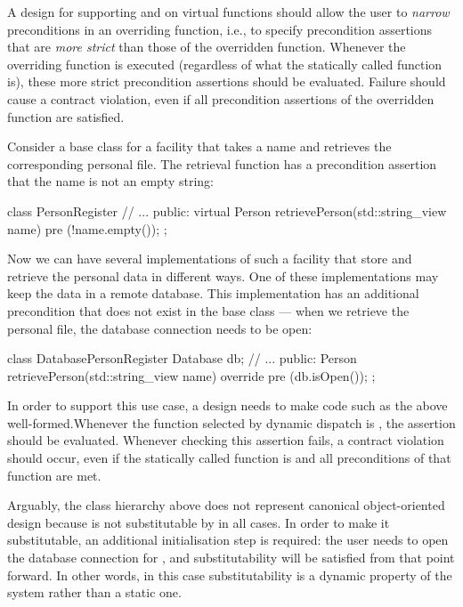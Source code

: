 
A design for supporting  and  on virtual functions should allow the user to \emph{narrow} preconditions in an overriding function, i.e., to specify precondition assertions 
 that are \emph{more strict} than those of the overridden function. Whenever the overriding function is executed (regardless of what the statically called function is), these more strict precondition assertions should be evaluated. Failure should cause a contract violation, even if all precondition assertions of the overridden function are satisfied.

Consider a base class for a facility that takes a name and retrieves the corresponding personal file. The retrieval function has a precondition assertion that the name is not an empty string:
\begin{codeblock} %
class PersonRegister {
  // ...
public:
  virtual Person retrievePerson(std::string_view name)
    pre (!name.empty());
};
\end{codeblock}
Now we can have several implementations of such a facility that store and retrieve the personal data in different ways. One of these implementations may keep the data in a remote database. This implementation has an additional precondition that does not exist in the base class --- when we retrieve the personal file, the database connection needs to be open:
\begin{codeblock}
class DatabasePersonRegister {
  Database db;
  // ...
public:
  Person retrievePerson(std::string_view name) override
    pre (db.isOpen());
};
\end{codeblock}
In order to support this use case, a design needs to make code such as the above well-formed.Whenever the function selected by dynamic dispatch is \allowbreak{}, the assertion  should be evaluated. Whenever checking this assertion fails, a contract violation should occur, even if the statically called function is \allowbreak{} and all preconditions of that function are met.

Arguably, the class hierarchy above does not represent canonical object-oriented design because  is not substitutable by  in all cases. In order to make it substitutable, an additional initialisation step is required: the user needs to open the database connection for  , and substitutability will be satisfied from that point forward. In other words, in this case substitutability is a dynamic property of the system rather than a static one.

